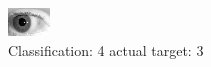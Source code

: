 \begin{figure}[h!]
\begin{center}
\includegraphics[width=0.60\columnwidth]{figures/ID276_class_4_target_3.png}
\end{center}
\caption{ Classification: 4 actual target: 3}
\label{fig:ID276_class_4_target_3}
\end{figure}
